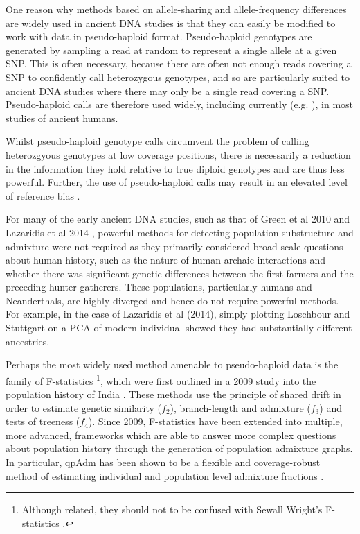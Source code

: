 One reason why methods based on allele-sharing and allele-frequency differences are widely used in ancient DNA studies is that they can easily be modified to work with data in pseudo-haploid format. Pseudo-haploid genotypes are generated by sampling a read at random to represent a single allele at a given SNP. This is often necessary, because there are often not enough reads covering a SNP to confidently call heterozygous genotypes, and so are particularly suited to ancient DNA studies where there may only be a single read covering a SNP. Pseudo-haploid calls are therefore used widely, including currently (e.g. \cite{sirak2021social}), in most studies of ancient humans. 

Whilst pseudo-haploid genotype calls circumvent the problem of calling heterozgyous genotypes at low coverage positions, there is necessarily a reduction in the information they hold relative to true diploid genotypes and are thus less powerful. Further, the use of pseudo-haploid calls may result in an elevated level of reference bias \cite{GuntherRefBias, Martiniano2017, martiniano2020removing}.


For many of the early ancient DNA studies, such as that of Green et al 2010 \cite{Green2010} and Lazaridis et al 2014 \cite{Lazaridis2014}, powerful methods for detecting population substructure and admixture were not required as they primarily considered broad-scale questions about human history, such as the nature of human-archaic interactions and whether there was significant genetic differences between the first farmers and the preceding hunter-gatherers. These populations, particularly humans and Neanderthals, are highly diverged and hence do not require powerful methods. For example, in the case of Lazaridis et al (2014), simply plotting Loschbour and Stuttgart on a PCA of modern individual showed they had substantially different ancestries.

Perhaps the most widely used method amenable to pseudo-haploid data is the family of F-statistics \footnote{Although related, they should not to be confused with Sewall Wright's F-statistics \cite{wright1949genetical}.}, which were first outlined in a 2009 study into the population history of India \cite{reich2009reconstructing}. These methods use the principle of shared drift in order to estimate genetic similarity ($f_{2}$), branch-length and admixture ($f_{3}$) and tests of treeness ($f_{4}$). Since 2009, F-statistics have been extended into multiple, more advanced, frameworks which are able to answer more complex questions about population history through the generation of population admixture graphs. In particular, qpAdm has been shown to be a flexible and coverage-robust method of estimating individual and population level admixture fractions \cite{AssessingqpAdm}. 

